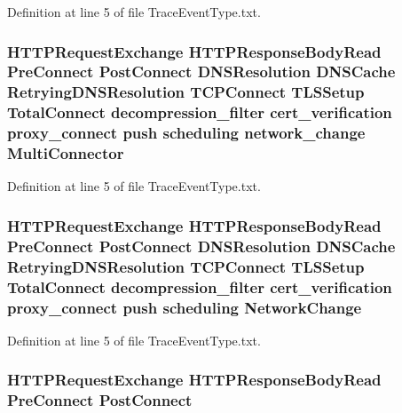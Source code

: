 Definition at line 5 of file Trace\+Event\+Type.\+txt.

\subsubsection[{Multi\+Connector}]{ H\+T\+T\+P\+Request\+Exchange H\+T\+T\+P\+Response\+Body\+Read {\bf Pre\+Connect} {\bf Post\+Connect} D\+N\+S\+Resolution D\+N\+S\+Cache Retrying\+D\+N\+S\+Resolution T\+C\+P\+Connect T\+L\+S\+Setup {\bf Total\+Connect} decompression\+\_\+filter cert\+\_\+verification proxy\+\_\+connect push scheduling network\+\_\+change Multi\+Connector}\label{TraceEventType_8txt_ac7fec43d0901d029531692e927bbd58e}


Definition at line 5 of file Trace\+Event\+Type.\+txt.

\subsubsection[{Network\+Change}]{ H\+T\+T\+P\+Request\+Exchange H\+T\+T\+P\+Response\+Body\+Read {\bf Pre\+Connect} {\bf Post\+Connect} D\+N\+S\+Resolution D\+N\+S\+Cache Retrying\+D\+N\+S\+Resolution T\+C\+P\+Connect T\+L\+S\+Setup {\bf Total\+Connect} decompression\+\_\+filter cert\+\_\+verification proxy\+\_\+connect push scheduling Network\+Change}\label{TraceEventType_8txt_a0e322a84426a7eef9cd0da56e2e9f1f9}


Definition at line 5 of file Trace\+Event\+Type.\+txt.

\subsubsection[{Post\+Connect}]{ H\+T\+T\+P\+Request\+Exchange H\+T\+T\+P\+Response\+Body\+Read {\bf Pre\+Connect} Post\+Connect}\label{TraceEventType_8txt_a6d4017c30f293266cc63886e60821ec6}


